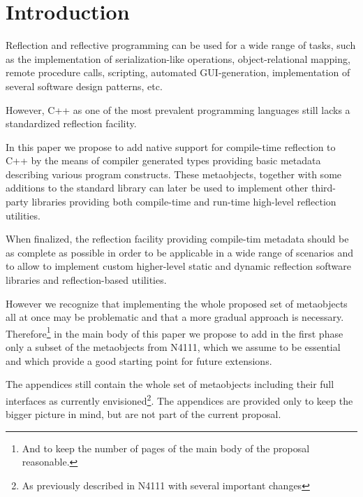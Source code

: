 \section{Introduction}

Reflection and reflective programming can be used
for a wide range of tasks, such as the implementation
of serialization-like operations, object-relational mapping,
remote procedure calls, scripting, automated GUI-generation,
implementation of several software design patterns, etc.

However, C++ as one of the most prevalent programming languages 
still lacks a standardized reflection facility.

In this paper we propose to add native support for
compile-time reflection to C++ by the means of compiler generated
types providing basic metadata describing various program constructs.
These metaobjects, together with some additions to the standard
library can later be used to implement other third-party libraries
providing both compile-time and run-time high-level
reflection utilities.

When finalized, the reflection facility providing compile-tim metadata
should be as complete as possible in order to be applicable in a wide
range of scenarios and to allow to implement custom higher-level
static and dynamic reflection software libraries and reflection-based
utilities.

However we recognize that implementing the whole proposed set of metaobjects
all at once may be problematic and that a more gradual approach is necessary.
Therefore\footnote{And to keep the number of pages of the main body of the proposal reasonable.}
in the main body of this paper we propose to add in the first phase
only a subset of the metaobjects from N4111, which we assume to be essential
and which provide a good starting point for future extensions.

The appendices still contain the whole set of metaobjects including their
full interfaces as currently envisioned\footnote{As previously described in N4111 with several
important changes}. The appendices are provided only to keep the bigger picture
in mind, but are not part of the current proposal.

